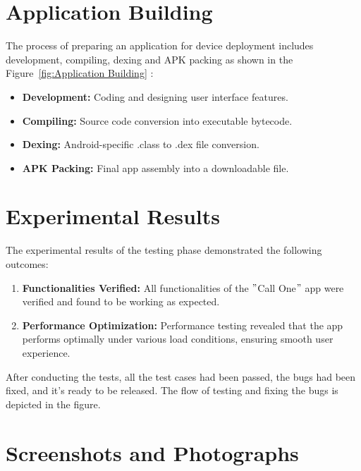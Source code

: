 \section{Application Building}\label{sec:app-building}

The process of preparing an application for device deployment includes development, compiling, dexing and  APK packing as shown in the Figure~\ref{fig:Application Building} :

\begin{itemize}
    \item \textbf{Development:} Coding and designing user interface features.
    \item \textbf{Compiling:} Source code conversion into executable bytecode.
    \item \textbf{Dexing:} Android-specific .class to .dex file conversion.
    \item \textbf{APK Packing:} Final app assembly into a downloadable file.
\end{itemize}

\section{Experimental Results}\label{sec:experimental-results}

The experimental results of the testing phase demonstrated the following outcomes:

\begin{enumerate}[label=\roman*.]
    \item \textbf{Functionalities Verified:} All functionalities of the \("\)Call One\("\) app were verified and found to be working as expected.

    \item \textbf{Performance Optimization:} Performance testing revealed that the app performs optimally under various load conditions, ensuring smooth user experience.

\end{enumerate}

After conducting the tests, all the test cases had been passed, the bugs had been fixed, and it's ready to be released.
The flow of testing and fixing the bugs is depicted in the figure.

\section{Screenshots and Photographs}\label{sec:screenshots-and-photographs}

